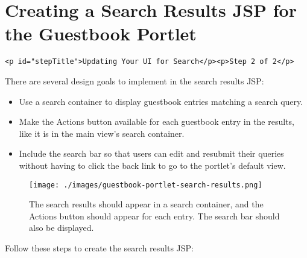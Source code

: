 \chapter{Creating a Search Results JSP for the Guestbook
Portlet}\label{creating-a-search-results-jsp-for-the-guestbook-portlet}

\begin{verbatim}
<p id="stepTitle">Updating Your UI for Search</p><p>Step 2 of 2</p>
\end{verbatim}

There are several design goals to implement in the search results JSP:

\begin{itemize}
\tightlist
\item
  Use a search container to display guestbook entries matching a search
  query.
\item
  Make the Actions button available for each guestbook entry in the
  results, like it is in the main view's search container.
\item
  Include the search bar so that users can edit and resubmit their
  queries without having to click the back link to go to the portlet's
  default view.
\end{itemize}

\begin{figure}
\centering
\texttt{[image: ./images/guestbook-portlet-search-results.png]}
\caption{The search results should appear in a search container, and the
Actions button should appear for each entry. The search bar should also
be displayed.}
\end{figure}

Follow these steps to create the search results JSP:


